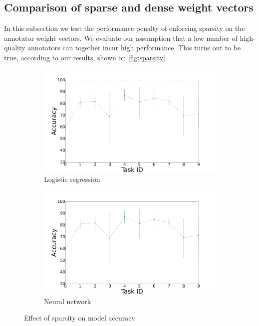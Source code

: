 \documentclass{llncs}
\begin{document}
\subsection{Comparison of sparse and dense weight vectors}

In this subsection we test the performance penalty of enforcing sparsity on the annotator weight vectors. We evaluate our assumption that a low number of high-quality annotators can together incur high performance. This turns out to be true, according to our results, shown on \autoref{fig:sparsity}.

\begin{figure}[!htb]
    \centering
    \begin{subfigure}[b]{0.45\textwidth}
        \includegraphics[width=\textwidth]{figures/plot_mlp}
        \caption{Logistic regression}
    \end{subfigure}
    \begin{subfigure}[b]{0.45\textwidth}
        \includegraphics[width=\textwidth]{figures/plot_mlp}
        \caption{Neural network}
    \end{subfigure}
    \caption{Effect of sparsity on model accuracy}
    \label{fig:sparsity}
\end{figure}
\end{document}
